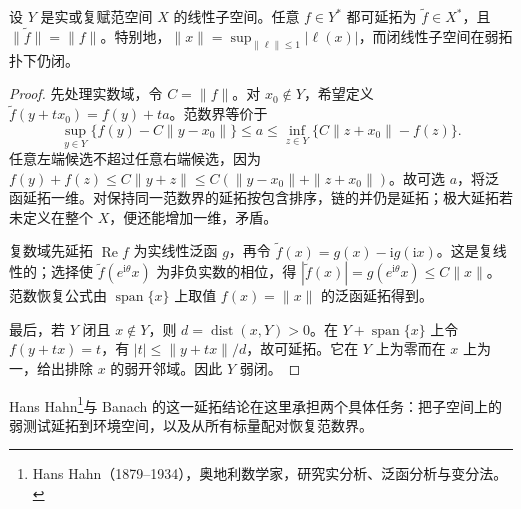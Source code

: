 \begin{lemma}\label{g3:lem:bounded-functional-extension}
	设 \(Y\) 是实或复赋范空间 \(X\) 的线性子空间。任意 \(f\in Y^*\) 都可延拓为 \(\widetilde f\in X^*\)，且 \(\|\widetilde f\|=\|f\|\)。特别地，\(\|x\|=\sup_{\|\ell\|\le1}|\ell(x)|\)，而闭线性子空间在弱拓扑下仍闭。
\end{lemma}
\begin{proof}
	先处理实数域，令 \(C=\|f\|\)。对 \(x_0\notin Y\)，希望定义 \(\widetilde f(y+tx_0)=f(y)+ta\)。范数界等价于
	\[
		\sup_{y\in Y}\{f(y)-C\|y-x_0\|\}\le a
		\le\inf_{z\in Y}\{C\|z+x_0\|-f(z)\}.
	\]
	任意左端候选不超过任意右端候选，因为
	\(f(y)+f(z)\le C\|y+z\|\le C(\|y-x_0\|+\|z+x_0\|)\)。故可选 \(a\)，将泛函延拓一维。对保持同一范数界的延拓按包含排序，链的并仍是延拓；极大延拓若未定义在整个 \(X\)，便还能增加一维，矛盾。

	复数域先延拓 \(\operatorname{Re}f\) 为实线性泛函 \(g\)，再令 \(\widetilde f(x)=g(x)-\mathrm i g(\mathrm ix)\)。这是复线性的；选择使 \(\widetilde f(e^{\mathrm i\theta}x)\) 为非负实数的相位，得 \(|\widetilde f(x)|=g(e^{\mathrm i\theta}x)\le C\|x\|\)。范数恢复公式由 \(\operatorname{span}\{x\}\) 上取值 \(f(x)=\|x\|\) 的泛函延拓得到。

	最后，若 \(Y\) 闭且 \(x\notin Y\)，则 \(d=\operatorname{dist}(x,Y)>0\)。在 \(Y+\operatorname{span}\{x\}\) 上令 \(f(y+tx)=t\)，有 \(|t|\le\|y+tx\|/d\)，故可延拓。它在 \(Y\) 上为零而在 \(x\) 上为一，给出排除 \(x\) 的弱开邻域。因此 \(Y\) 弱闭。
\end{proof}

Hans Hahn\footnote{Hans Hahn（1879--1934），奥地利数学家，研究实分析、泛函分析与变分法。}与 Banach 的这一延拓结论在这里承担两个具体任务：把子空间上的弱测试延拓到环境空间，以及从所有标量配对恢复范数界。

